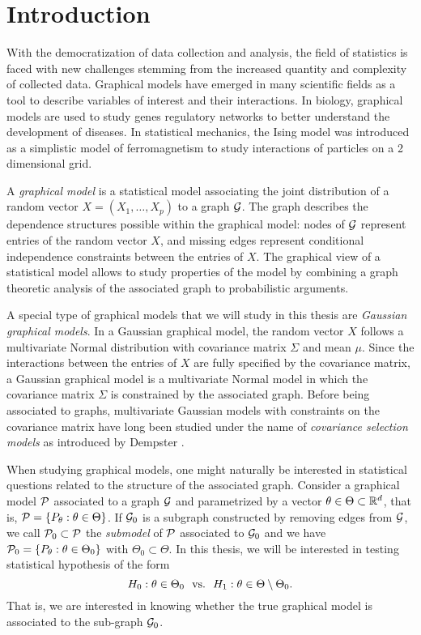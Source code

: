 \section{Introduction}

With the democratization of data collection and analysis, the field of statistics is faced with new challenges stemming from the increased quantity and complexity of collected data. Graphical models have emerged in many scientific fields as a tool to describe variables of interest and their interactions. In biology, graphical models are used to study genes regulatory networks to better understand the development of diseases. In statistical mechanics, the Ising model \cite{ising1925beitrag} was introduced as a simplistic model of ferromagnetism to study interactions of particles on a 2 dimensional grid.

A \textit{graphical model} is a statistical model associating the joint distribution of a random vector $X = (X_1, \ldots, X_p)$ to a graph ${\mathcal{G}}$. The graph describes the dependence structures possible within the graphical model: nodes of ${\mathcal{G}}$ represent entries of the random vector $X$, and missing edges represent conditional independence constraints between the entries of $X$. The graphical view of a statistical model allows to study properties of the model by combining a graph theoretic analysis of the associated graph to probabilistic arguments.

A special type of graphical models that we will study in this thesis are \textit{Gaussian graphical models}. In a Gaussian graphical model, the random vector $X$ follows a multivariate Normal distribution with covariance matrix $\Sigma$ and mean $\mu$. Since the interactions between the entries of $X$ are fully specified by the covariance matrix, a Gaussian graphical model is a multivariate Normal model in which the covariance matrix $\Sigma$ is constrained by the associated graph. Before being associated to graphs, multivariate Gaussian models with constraints on the covariance matrix have long been studied under the name of \textit{covariance selection models} as introduced by Dempster \cite{10.2307/2528966}.

When studying graphical models, one might naturally be interested in statistical questions related to the structure of the associated graph. Consider a graphical model ${\mathcal{P}}$ associated to a graph ${\mathcal{G}}$ and parametrized by a vector $\theta \in \Theta \subset \mathbb{R}^d$, that is, ${\mathcal{P}} = {\left\{ P_\theta : \theta \in \Theta \right\}}$. If ${\mathcal{G}}_0$ is a subgraph constructed by removing edges from ${\mathcal{G}}$, we call ${\mathcal{P}}_0 \subset {\mathcal{P}}$ the \textit{submodel} of ${\mathcal{P}}$ associated to ${\mathcal{G}}_0$ and we have ${\mathcal{P}}_0 = {\left\{ P_\theta : \theta \in \Theta_0 \right\}}$ with $\Theta_0 \subset \Theta$. In this thesis, we will be interested in testing statistical hypothesis of the form
\begin{equation*}
    H_0 : \theta \in \Theta_0 \ \ \t{vs.} \ \ H_1 : \theta \in \Theta \setminus \Theta_0.
\end{equation*}
That is, we are interested in knowing whether the true graphical model is associated to the sub-graph ${\mathcal{G}}_0$.


